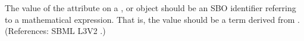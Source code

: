 The value of the attribute  on a \AlgebraicRule, \RateRule
or \AssignmentRule object should be an SBO identifier referring to a
mathematical expression.  That is, the value should be a term derived from
\sbomathformula.  (References: SBML L3V2 .)
